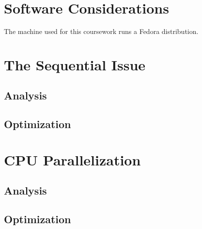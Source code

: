 \documentclass{egpubl}
\begin{document}
\section{Software Considerations}

The machine used for this coursework runs a Fedora distribution.

\section{The Sequential Issue}

\subsection{Analysis}

\subsection{Optimization}


\section{CPU Parallelization}

\subsection{Analysis}

\subsection{Optimization}

\end{document}
